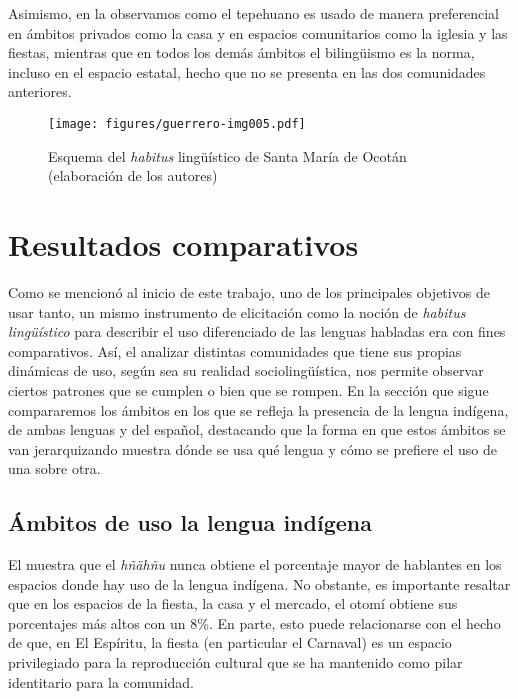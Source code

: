 \documentclass[output=paper]{../langscibook}
\begin{document}
Asimismo, en la  observamos como el tepehuano es usado de manera preferencial en ámbitos privados como la casa y en espacios comunitarios como la iglesia y las fiestas, mientras que en todos los demás ámbitos el bilingüismo es la norma, incluso en el espacio estatal, hecho que no se presenta en las dos comunidades anteriores.




\begin{figure}
\caption{\label{fig:guerrero:5} Esquema del \emph{habitus} lingüístico de Santa María de Ocotán (elaboración de los autores)}
\texttt{[image: figures/guerrero-img005.pdf]}
\end{figure}


 \section{Resultados comparativos}


Como se mencionó al inicio de este trabajo, uno de los principales objetivos de usar tanto, un mismo instrumento de elicitación como la noción de \textit{habitus lingüístico} para describir el uso diferenciado de las lenguas habladas era con fines comparativos. Así, el analizar distintas comunidades que tiene sus propias dinámicas de uso, según sea su realidad sociolingüística, nos permite observar ciertos patrones que se cumplen o bien que se rompen. En la sección que sigue compararemos los ámbitos en los que se refleja la presencia de la lengua indígena, de ambas lenguas y del español, destacando que la forma en que estos ámbitos se van jerarquizando muestra dónde se usa qué lengua y cómo se prefiere el uso de una sobre otra.



 \subsection{Ámbitos de uso la lengua indígena}



El  muestra que el \textit{hñähñu} nunca obtiene el porcentaje mayor de hablantes en los espacios donde hay uso de la lengua indígena. No obstante, es importante resaltar que en los espacios de la fiesta, la casa y el mercado, el otomí obtiene sus porcentajes más altos con un 8\%. En parte, esto puede relacionarse con el hecho de que, en El Espíritu, la fiesta (en particular el Carnaval) es un espacio privilegiado para la reproducción cultural que se ha mantenido como pilar identitario para la comunidad.
\end{document}
